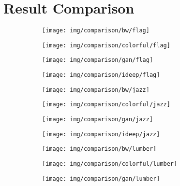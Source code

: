 \section{Result Comparison}

\begin{figure}[!ht]
	\centering
	\begin{subfigure}{.23\textwidth}
		\centering
		\texttt{[image: img/comparison/bw/flag]}
	\end{subfigure}
    \begin{subfigure}{.23\textwidth}
		\centering
		\texttt{[image: img/comparison/colorful/flag]}
    \end{subfigure}
    \begin{subfigure}{.23\textwidth}
		\centering
		\texttt{[image: img/comparison/gan/flag]}
    \end{subfigure}
    \begin{subfigure}{.23\textwidth}
		\centering
		\texttt{[image: img/comparison/ideep/flag]}
    \end{subfigure}
	\begin{subfigure}{.23\textwidth}
		\centering
		\texttt{[image: img/comparison/bw/jazz]}
	\end{subfigure}
    \begin{subfigure}{.23\textwidth}
		\centering
		\texttt{[image: img/comparison/colorful/jazz]}
    \end{subfigure}
    \begin{subfigure}{.23\textwidth}
		\centering
		\texttt{[image: img/comparison/gan/jazz]}
    \end{subfigure}
    \begin{subfigure}{.23\textwidth}
		\centering
		\texttt{[image: img/comparison/ideep/jazz]}
    \end{subfigure}
	\begin{subfigure}{.23\textwidth}
		\centering
		\texttt{[image: img/comparison/bw/lumber]}
	\end{subfigure}
    \begin{subfigure}{.23\textwidth}
		\centering
		\texttt{[image: img/comparison/colorful/lumber]}
    \end{subfigure}
    \begin{subfigure}{.23\textwidth}
		\centering
		\texttt{[image: img/comparison/gan/lumber]}
    \end{subfigure}

\end{figure}
